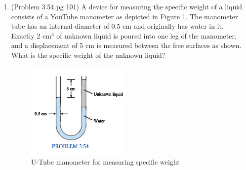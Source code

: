 \documentclass[12pt]{article}
\begin{document}
\begin{enumerate}
\item (Problem 3.54 pg 101)
A device for measuring the specific weight of a liquid consists of a YouTube manometer as depicted in Figure \ref{fig:YouTubeManometer}.
The manometer tube has an internal diameter of 0.5 cm and originally has water in it.
Exactly 2 cm$^3$ of unknown liquid is poured into one leg of the manometer, and a displacement of 5 cm is measured between the free surfaces as shown.  What is the specific weight of the unknown liquid?
\begin{figure}[htbp] %
   \centering
   \includegraphics[width=2in]{YouTubeManometer.jpg} 
   \caption{U-Tube manometer for measuring specific weight}
   \label{fig:YouTubeManometer}
\end{figure}

~
\end{enumerate}
\end{document}
